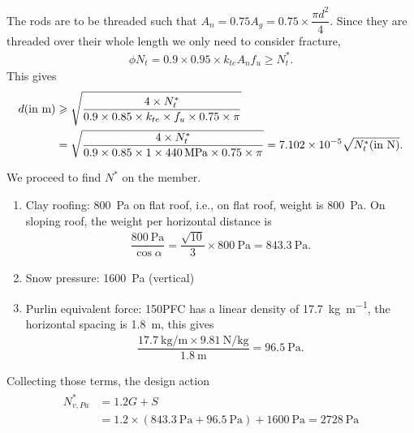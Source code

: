 \begin{solution}
The rods are to be threaded such that $A_n=0.75A_g=0.75\times\dfrac{\pi{}d^2}{4}$. Since they are threaded over their whole length we only need to consider fracture,
\begin{gather*}
\phi{}N_t=0.9\times0.95\times{}k_{te}A_nf_u\geqslant{}N^*_t.
\end{gather*}
This gives
\begin{gather*}
\begin{split}
d(\text{in~}\si{\meter})&\geqslant\sqrt{\dfrac{4\times{}N^*_t}{0.9\times0.85\times{}k_{te}\times{}f_u\times0.75\times\pi{}}}\\&=\sqrt{\dfrac{4\times{}N^*_t}{0.9\times0.85\times{}1\times{}\SI{440}{\mega\pascal}\times0.75\times\pi{}}}=\num{7.102e-5}\sqrt{N^*_t(\text{in~}\si{\newton})}.
\end{split}
\end{gather*}

We proceed to find $N^*$ on the member.
\begin{enumerate}
\item Clay roofing: \SI{800}{\pascal} on flat roof, i.e., on flat roof, weight is \SI{800}{\pascal}. On sloping roof, the weight per horizontal distance is
\begin{gather*}
\dfrac{\SI{800}{\pascal}}{\cos\alpha}=\dfrac{\sqrt{10}}{3}\times\SI{800}{\pascal}=\SI{843.3}{\pascal}.
\end{gather*}
\begin{figure}[H]
\centering\footnotesize
{}
\end{figure}
\item Snow pressure: \SI{1600}{\pascal} (vertical)
\item Purlin equivalent force: 150PFC has a linear density of \SI{17.7}{\kilogram\per\meter}, the horizontal spacing is \SI{1.8}{\meter}, this gives
\begin{gather*}
\dfrac{\SI{17.7}{\kilogram\per\meter}\times\SI{9.81}{\newton\per\kilogram}}{\SI{1.8}{\meter}}=\SI{96.5}{\pascal}.
\end{gather*}
\end{enumerate}
Collecting those terms, the design action
\begin{gather*}
\begin{split}
N^*_{v,Pa}&=1.2G+S\\&=1.2\times\left(\SI{843.3}{\pascal}+\SI{96.5}{\pascal}\right)+\SI{1600}{\pascal}=\SI{2728}{\pascal}
\end{split}
\end{gather*}


\end{solution}
